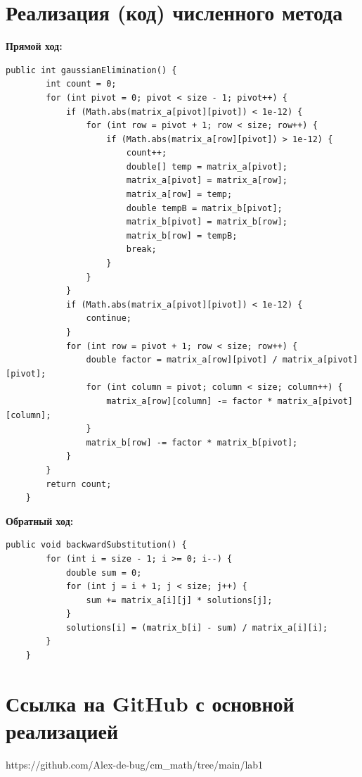 \documentclass{article}
\begin{document}
\section{Реализация (код) численного метода}
\textbf{Прямой ход:}
\begin{lstlisting}[frame=single, basicstyle=\ttfamily, breaklines=true, breakatwhitespace=true, postbreak=\mbox{\textcolor{red}{$\hookrightarrow$}\space}]
    public int gaussianElimination() {
        int count = 0;
        for (int pivot = 0; pivot < size - 1; pivot++) {
            if (Math.abs(matrix_a[pivot][pivot]) < 1e-12) {
                for (int row = pivot + 1; row < size; row++) {
                    if (Math.abs(matrix_a[row][pivot]) > 1e-12) {
                        count++;
                        double[] temp = matrix_a[pivot];
                        matrix_a[pivot] = matrix_a[row];
                        matrix_a[row] = temp;
                        double tempB = matrix_b[pivot];
                        matrix_b[pivot] = matrix_b[row];
                        matrix_b[row] = tempB;
                        break;
                    }
                }
            }
            if (Math.abs(matrix_a[pivot][pivot]) < 1e-12) {
                continue;
            }
            for (int row = pivot + 1; row < size; row++) {
                double factor = matrix_a[row][pivot] / matrix_a[pivot][pivot];
                for (int column = pivot; column < size; column++) {
                    matrix_a[row][column] -= factor * matrix_a[pivot][column];
                }
                matrix_b[row] -= factor * matrix_b[pivot];
            }
        }
        return count;
    }
\end{lstlisting}
\textbf{Обратный ход:}
\begin{lstlisting}[frame=single, basicstyle=\ttfamily, breaklines=true, breakatwhitespace=true, postbreak=\mbox{\textcolor{red}{$\hookrightarrow$}\space}]
    public void backwardSubstitution() {
        for (int i = size - 1; i >= 0; i--) {
            double sum = 0;
            for (int j = i + 1; j < size; j++) {
                sum += matrix_a[i][j] * solutions[j];
            }
            solutions[i] = (matrix_b[i] - sum) / matrix_a[i][i];
        }
    }
\end{lstlisting}
\section{Ссылка на GitHub с основной реализацией}
https://github.com/Alex-de-bug/cm\_math/tree/main/lab1
\end{document}
